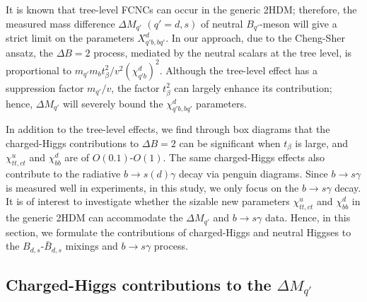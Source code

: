 \documentclass[prd,preprint,superscriptaddress,amsmath,amssymb]{revtex4}
\begin{document}
It is known that  tree-level FCNCs can occur in the generic 2HDM; therefore, the measured mass difference $\Delta M_{q'}$ $(q'=d,s)$ of neutral $B_{q'}$-meson will give a strict limit on the  parameters $X^d_{q'b, bq'}$. In our approach, due to the   Cheng-Sher ansatz, the $\Delta B=2$ process,  mediated by the neutral scalars at the tree level,  is proportional to $m_{q'}m_b t^2_\beta/ v^2 (\chi^d_{q' b})^2$. Although the tree-level effect has a suppression factor $m_{q'}/v$, the  factor $t^2_\beta$ can largely enhance its contribution; hence,  $\Delta M_{q'}$ will  severely  bound the  $\chi^d_{q'b, bq'}$ parameters.  

 In addition to the tree-level effects, we find through box diagrams that  the charged-Higgs contributions to $\Delta B=2$  can be significant when $t_\beta$ is large, and $\chi^u_{tt,ct}$ and $\chi^d_{bb}$ are of $O(0.1)$-$O(1)$.  The same charged-Higgs effects also contribute to  the radiative $b\to s(d) \gamma$ decay via penguin diagrams. Since $b\to s \gamma$ is measured well in experiments, in this study, we only focus on the $b\to s \gamma$ decay. It is of interest to investigate whether the sizable new parameters $\chi^{u}_{tt,ct}$ and $\chi^d_{bb}$  in the generic 2HDM can accommodate the  $\Delta M_{q'}$ and $b\to s \gamma$ data.  Hence,  in this section, we formulate the contributions of charged-Higgs and neutral Higgses to the $B_{d, s}$-$\bar B_{d,s}$ mixings and $b\to s \gamma$ process. 




\subsection{ Charged-Higgs contributions to the $\Delta M_{q'}$ }
\end{document}
